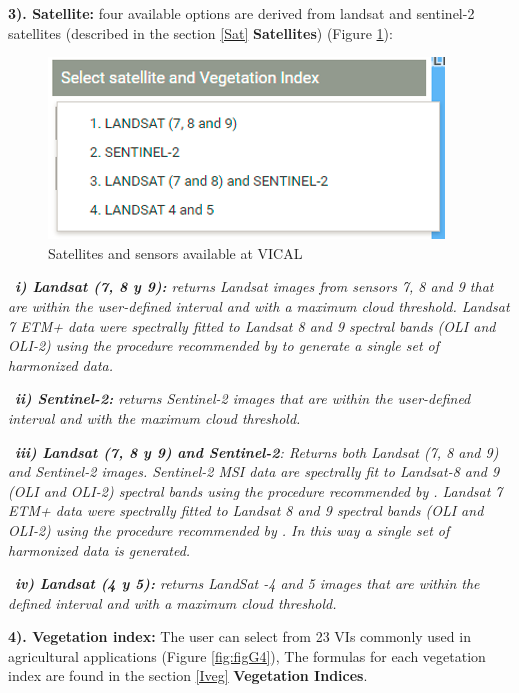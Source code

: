 \documentclass[
]{book}
\begin{document}
\textbf{3). Satellite: } four available options are derived from landsat and sentinel-2 satellites (described in the section \ref{Sat} \textbf{Satellites}) (Figure \ref{fig:figG3}):

\begin{figure}

{\centering \includegraphics{./images/Figure3} 

}

\caption{Satellites and sensors available at VICAL}\label{fig:figG3}
\end{figure}

~\emph{\textbf{i) Landsat (7, 8 y 9):} returns Landsat images from sensors 7, 8 and 9 that are within the user-defined interval and with a maximum cloud threshold. Landsat 7 ETM+ data were spectrally fitted to Landsat 8 and 9 spectral bands (OLI and OLI-2) using the procedure recommended by \citep{Roy2016} to generate a single set of harmonized data.}

~\emph{\textbf{ii) Sentinel-2:} returns Sentinel-2 images that are within the user-defined interval and with the maximum cloud threshold.}

~\emph{\textbf{iii) Landsat (7, 8 y 9) and Sentinel-2}: Returns both Landsat (7, 8 and 9) and Sentinel-2 images. Sentinel-2 MSI data are spectrally fit to Landsat-8 and 9 (OLI and OLI-2) spectral bands using the procedure recommended by \citep{Claverie2018}. Landsat 7 ETM+ data were spectrally fitted to Landsat 8 and 9 spectral bands (OLI and OLI-2) using the procedure recommended by \citep{Roy2016}. In this way a single set of harmonized data is generated.}

~\emph{\textbf{iv) Landsat (4 y 5):} returns LandSat -4 and 5 images that are within the defined interval and with a maximum cloud threshold.}

\textbf{4). Vegetation index: } The user can select from 23 VIs commonly used in agricultural applications (Figure \ref{fig:figG4}), The formulas for each vegetation index are found in the section \ref{Iveg} \textbf{Vegetation Indices}.
\end{document}
